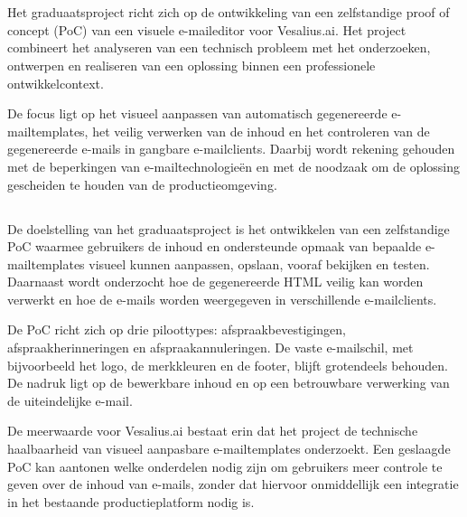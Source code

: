 
\chapter{}%
\label{ch:reflectie}
Het graduaatsproject richt zich op de ontwikkeling van een zelfstandige proof
of concept (PoC) van een visuele e-maileditor voor Vesalius.ai. Het project
combineert het analyseren van een technisch probleem met het onderzoeken,
ontwerpen en realiseren van een oplossing binnen een professionele
ontwikkelcontext.

De focus ligt op het visueel aanpassen van automatisch gegenereerde
e-mailtemplates, het veilig verwerken van de inhoud en het controleren van
de gegenereerde e-mails in gangbare e-mailclients. Daarbij wordt rekening
gehouden met de beperkingen van e-mailtechnologieën en met de noodzaak om
de oplossing gescheiden te houden van de productieomgeving.

\section{}%
\label{sec:conclusie}
De doelstelling van het graduaatsproject is het ontwikkelen van een
zelfstandige PoC waarmee gebruikers de inhoud en ondersteunde opmaak van
bepaalde e-mailtemplates visueel kunnen aanpassen, opslaan, vooraf bekijken
en testen. Daarnaast wordt onderzocht hoe de gegenereerde HTML veilig kan
worden verwerkt en hoe de e-mails worden weergegeven in verschillende
e-mailclients.

De PoC richt zich op drie piloottypes: afspraakbevestigingen,
afspraakherinneringen en afspraakannuleringen. De vaste e-mailschil, met
bijvoorbeeld het logo, de merkkleuren en de footer, blijft grotendeels
behouden. De nadruk ligt op de bewerkbare inhoud en op een betrouwbare
verwerking van de uiteindelijke e-mail.

De meerwaarde voor Vesalius.ai bestaat erin dat het project de technische
haalbaarheid van visueel aanpasbare e-mailtemplates onderzoekt. Een
geslaagde PoC kan aantonen welke onderdelen nodig zijn om gebruikers meer
controle te geven over de inhoud van e-mails, zonder dat hiervoor onmiddellijk
een integratie in het bestaande productieplatform nodig is.

